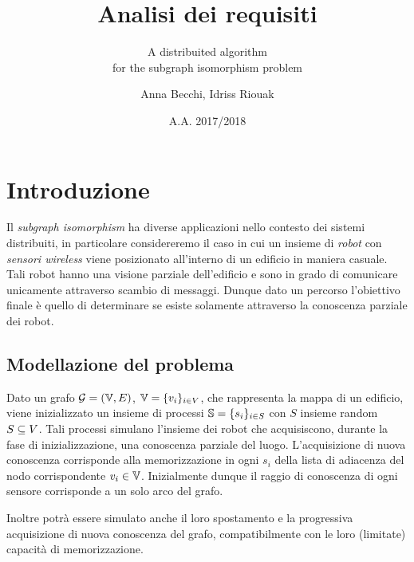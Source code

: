 \documentclass{llncs}
\subtitle{A distribuited algorithm\\for the subgraph isomorphism problem}
\title{Analisi dei requisiti}
\author{Anna Becchi, Idriss Riouak}
\institute{Laurea Magistrale in Informatica\\Universit\`a di Udine, Italy}
\date{A.A. 2017/2018}
\begin{document}
\maketitle

\section{Introduzione}
Il \emph{subgraph isomorphism} ha diverse applicazioni nello contesto
dei sistemi distribuiti, in particolare considereremo il caso in cui  un insieme
di \emph{robot} con \emph{sensori wireless} viene posizionato all'interno di
un edificio in maniera casuale. Tali robot hanno una visione parziale dell'edificio
e sono in grado di comunicare unicamente attraverso scambio di messaggi.
Dunque dato un percorso l'obiettivo finale è quello di determinare se esiste
solamente attraverso la conoscenza parziale dei robot.

\subsection{Modellazione del problema}
Dato un grafo $\mathcal{G} = ( \mathbb{V}, E)$, $\mathbb{V} = \{v_i\}_{i \in V}$,
che rappresenta la mappa di un edificio, viene inizializzato un
insieme di processi $\mathbb{S} = \{s_i \}_{i \in S}$ con $S$ insieme
random $S \subseteq V$.
Tali processi simulano l'insieme dei robot che
acquisiscono, durante la fase di inizializzazione, una conoscenza
parziale del luogo. L'acquisizione di nuova conoscenza corrisponde
alla memorizzazione in ogni $s_i$ della lista di adiacenza del nodo
corrispondente $v_i \in \mathbb{V}$.
Inizialmente dunque il raggio di conoscenza di ogni sensore corrisponde
a un solo arco del grafo.

Inoltre potrà essere simulato anche il loro spostamento e la progressiva
acquisizione di nuova conoscenza del grafo, compatibilmente con le
loro (limitate) capacità di memorizzazione.
\end{document}
